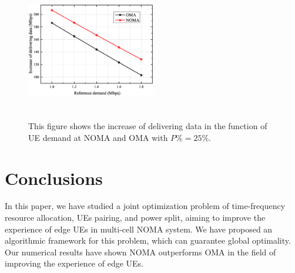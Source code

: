 \documentclass[10pt,journal,final,finalsubmission,twocolumn]{IEEEtran}
\begin{document}
\begin{figure}
\centering
\includegraphics[width=0.5\textwidth, height=6.1cm]{3.eps}
\caption{This figure shows the increase of delivering data in the function of UE demand at NOMA and OMA with $P\% = 25\%$.}
\label{3}
\end{figure}





\section{Conclusions}\label{Sec:Conclusions}

In this paper, we have studied a joint optimization problem of time-frequency resource allocation, UEs pairing, and power split, aiming to improve the experience of edge UEs in multi-cell NOMA system. We have proposed an algorithmic framework for this problem, which can guarantee global optimality. Our numerical results have shown NOMA outperforms OMA in the field of improving the experience of edge UEs. 
\end{document}
